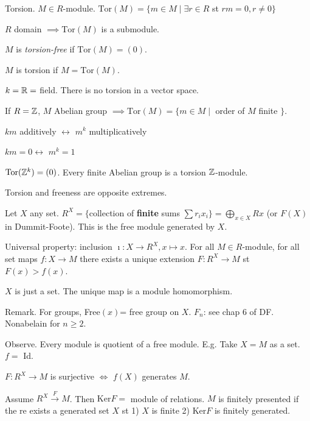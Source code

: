 \documentclass{./template}
\newcommand{\Tor}{\textrm{Tor}}
\newcommand{\Ker}{\textrm{Ker}}
\begin{document}
  { Torsion. $M\in R$-module. $\Tor(M)=\{ m\in M \mid \exists r\in R $ st $ rm=0, r\neq 0\}$
  }

  {\exe $R$ domain $\implies \Tor(M)$ is a submodule.  }

  $M$ is {\em torsion-free} if $\Tor(M)=(0)$.

  $M$ is torsion if $M=\Tor(M)$.

  {\ex $k=\mathbb R=$ field. There is no torsion in a vector space.}

  If $R=\mathbb Z$, $M$ Abelian group $\implies \Tor(M) = \{m\in M \mid $  order of $M$ finite $\}$.

  $km$ additively $\leftrightarrow$ $m^k$ multiplicatively

  $km=0 \leftrightarrow$ $m^k=1$

  $\Tor(\Z^k)=(0)$. Every finite Abelian group is a torsion $\mathbb Z$-module.
  
  Torsion and freeness are opposite extremes.

  Let $X$ any set. $R^X=\{ $collection of {\bf finite} sums $\sum r_ix_i \}=\bigoplus_{x\in X} Rx$ (or $F(X)$ in Dummit-Foote). This is the free module generated by $X$.

  Universal property: inclusion $\imath : X\to R^X, x\mapsto x$. For all $M \in R$-module, for all set maps $f:X\to M$ there exists a unique extension $F:R^X\to M$ st $F(x)>f(x)$.

  \begin{center}
\end{center}

  $X$ is just a set. The unique map is a module homomorphism.

  Remark. For groups, Free$(x)$= free group on $X$. $F_n$: see chap 6 of DF. Nonabelain for $n\geq 2$.

  \hrulefill

  Observe. Every module is quotient of a free module. E.g. Take $X=M$ as a set. $f=$ Id.

  $F:R^X\to M$ is surjective $\iff$ $f(X)$ generates $M$.

  \hrulefill

  Assume $R^X \xrightarrow F M$. Then $\Ker F = $ module of relations. $M$ is finitely presented if the re exists a generated set $X$ st 1) $X$ is finite 2) $\Ker F$ is finitely generated.
\end{document}
